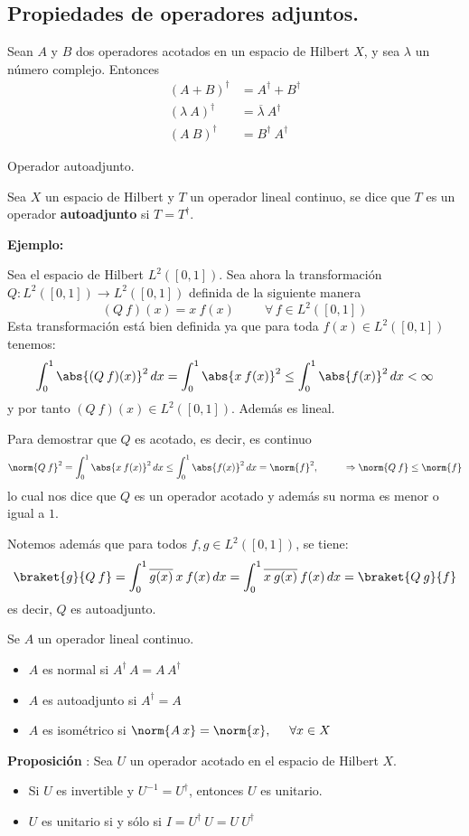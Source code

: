 \subsection*{Propiedades de operadores adjuntos.}
Sean $A$ y $B$ dos operadores acotados en un espacio de Hilbert $X$, y sea $\lambda$ un número complejo. Entonces
\begin{align*}
(A + B)^{\dagger} &= A^{\dagger} + B^{\dagger} \\
(\lambda \: A)^{\dagger} &= \overline{\lambda} \: A^{\dagger} \\
(A \: B)^{\dagger} &= B^{\dagger} \: A^{\dagger}
\end{align*}
\begin{defi} Operador autoadjunto.

Sea $X$ un espacio de Hilbert y $T$ un operador lineal continuo, se dice que $T$ es un operador \textbf{autoadjunto} si $T = T^{\dagger}$.
\end{defi}
\textbf{Ejemplo:}

Sea el espacio de Hilbert $L^{2} ([0, 1])$. Sea ahora la transformación $Q : L^{2} ([0, 1]) \rightarrow L^{2}([0, 1])$ definida de la siguiente manera
\[ (Q \: f)(x) =  x \: f(x) \hspace{1cm} \forall \, f \in L^{2}([0, 1]) \]
Esta transformación está bien definida ya que para toda $f(x) \in L^{2} ([0, 1])$ tenemos:
\[ \int_{0}^{1} \abs{(Q \: f)(x)}^{2} \, dx = \int_{0}^{1} \abs{x \: f(x)}^{2} \leq \int_{0}^{1} \abs{f(x)}^{2} \, dx < \infty \]
y por tanto $(Q \: f)(x) \in L^{2}([0, 1])$. Además es lineal.
\par
Para demostrar que $Q$ es acotado, es decir, es continuo
\[ \norm{Q \: f}^{2} = \int_{0}^{1} \abs{x \: f(x)}^{2} \, dx   \leq \int_{0}^{1} \abs{f(x)}^{2} \, dx = \norm{f}^{2}, \hspace{1cm} \Rightarrow \norm{Q \: f} \leq \norm{f} \]
lo cual nos dice que $Q$ es un operador acotado y además su norma es menor o igual a $1$.

Notemos además que para todos $f, g \in L^{2} ([0, 1])$, se tiene:
\[ \braket{g}{Q \: f} = \int_{0}^{1} \overline{g(x)} \: x \: f(x) \, dx = \int_{0}^{1} \overline{x \: g(x)} \: f(x) \, dx = \braket{Q \: g}{f} \]
es decir, $Q$ es autoadjunto.
\begin{defi} Se $A$ un operador lineal continuo.
\begin{itemize}
\item $A$ es normal si $A^{\dagger} \, A = A \, A^{\dagger}$
\item $A$ es autoadjunto si $A^{\dagger} =  A$
\item $A$ es isométrico si $\norm{A \: x} =  \norm{x}, \hspace{0.5cm} \forall x \in X$
\end{itemize}
\end{defi}
\textbf{Proposición} : Sea $U$ un operador acotado en el espacio de Hilbert $X$.
\begin{itemize}
\item Si $U$ es invertible y $U^{-1} = U^{\dagger}$, entonces $U$ es unitario.
\item $U$ es unitario si y sólo si $I = U^{\dagger} \: U = U \: U^{\dagger}$ 
\end{itemize}

